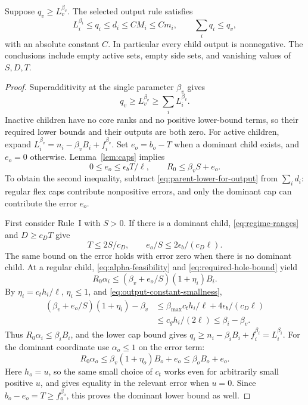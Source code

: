 \begin{lemma}
\label{lem:output-feasibility}
Suppose \(q_v\ge L_v^{\beta_v}\).  The selected output rule satisfies
\[
 L_i^{\beta_i}\le q_i\le d_i\le C M_i\le C m_i,
 \qquad \sum_iq_i\le q_v,
\]
with an absolute constant \(C\).  In particular every child output is
nonnegative.  The conclusions include empty active sets, empty side sets,
and vanishing values of \(S,D,T\).
\end{lemma}

\begin{proof}
Superadditivity at the single parameter \(\beta_v\) gives
\begin{equation}
 q_v\ge L_v^{\beta_v}\ge\sum_iL_i^{\beta_v}.
 \label{eq:parent-lower-for-output}
\end{equation}
Inactive children have no core ranks and no positive lower-bound terms,
so their required lower bounds and their outputs are both zero.
For active children, expand
\(L_i^{\beta_v}=n_i-\beta_vB_i+f_i^{\beta_v}\).
Set \(e_o=b_o-T\) when a dominant child exists, and \(e_o=0\) otherwise.
Lemma~\ref{lem:caps} implies
\begin{equation}
 0\le e_o\le\epsilon_bT/\ell,
 \qquad R_0\le\beta_vS+e_o.
 \label{eq:required-hole-bound}
\end{equation}
To obtain the second inequality, subtract
\eqref{eq:parent-lower-for-output} from \(\sum_i d_i\): regular flex
caps contribute nonpositive errors, and only the dominant cap can
contribute the error \(e_o\).

First consider Rule~I with \(S>0\).  If there is a dominant child,
\eqref{eq:regime-ranges} and \(D\ge c_DT\) give
\begin{equation}
 T\le 2S/c_D,
 \qquad e_o/S\le 2\epsilon_b/(c_D\ell).
 \label{eq:rule-one-flex-comparison}
\end{equation}
The same bound on the error holds with error zero when there is no
dominant child.  At a regular child, \eqref{eq:alpha-feasibility} and
\eqref{eq:required-hole-bound} yield
\[
 R_0\alpha_i
 \le(\beta_v+e_o/S)(1+\eta_i)B_i.
\]
By \(\eta_i=c_th_i/\ell\), \(\eta_i\le1\), and
\eqref{eq:output-constant-smallness},
\begin{align*}
 (\beta_v+e_o/S)(1+\eta_i)-\beta_v
 &\le \beta_{\max}c_t h_i/\ell
       +4\epsilon_b/(c_D\ell)\\
 &\le c_gh_i/(2\ell)
 \le\beta_i-\beta_v.
\end{align*}
Thus \(R_0\alpha_i\le\beta_iB_i\), and the lower cap bound gives
\(q_i\ge n_i-\beta_iB_i+f_i^{\beta_i}=L_i^{\beta_i}\).
For the dominant coordinate use \(\alpha_o\le1\) on the error term:
\[
 R_0\alpha_o
 \le\beta_v(1+\eta_o)B_o+e_o
 \le\beta_oB_o+e_o.
\]
Here \(h_o=u\), so the same small choice of \(c_t\) works even for
arbitrarily small positive \(u\), and gives equality in the relevant
error when \(u=0\).  Since \(b_o-e_o=T\ge f_o^{\beta_o}\), this proves
the dominant lower bound as well.


\end{proof}
